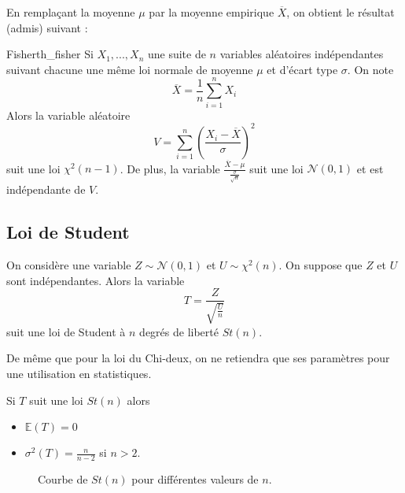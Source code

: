 En remplaçant la moyenne $\mu$ par la moyenne empirique $\overline{X}$, on obtient le résultat (admis) suivant :

\begin{theoreme}{Fisher}{th_fisher}
	Si $X_1,...,X_n$ une suite de $n$ variables aléatoires indépendantes suivant chacune une même loi normale de moyenne $\mu$ et d'écart type $\sigma$. On note $$\overline{X}=\frac{1}{n}\sum_{i=1}^n X_i$$
	Alors la variable aléatoire 
	$$V =  \sum_{i=1}^{n} \left(\frac{X_i-\overline{X}}{\sigma} \right)^2$$
	suit une loi $\chi^2(n-1)$.
	De plus, la variable $\frac{\overline{X}-\mu}{\frac{\sigma}{\sqrt{n}}}$ suit une loi $\mathcal{N}(0,1)$ et est indépendante de $V$. 
\end{theoreme}

\subsection{Loi de Student}
\begin{definition}{}{}
	On considère une variable $Z \sim \mathcal{N}(0,1)$ et $U \sim \chi^2(n)$. On suppose que $Z$ et $U$ sont indépendantes. Alors la variable $$T=\frac{Z}{\sqrt{\frac{U}{n}}}$$ suit une loi de Student à $n$ degrés de liberté $St(n)$.
\end{definition}

De même que pour la loi du Chi-deux, on ne retiendra que ses paramètres pour une utilisation en statistiques.

\begin{proposition}{}{}
	Si $T$ suit une loi $St(n)$ alors 
	\begin{itemize}
		\item $\mathbb{E}(T) = 0$
		\item $\sigma^2(T)=\frac{n}{n-2}$ si $n>2$.
	\end{itemize}
\end{proposition}

\begin{figure}[h!]
	\centering
	\caption{Courbe de $St(n)$ pour différentes valeurs de $n$.  }
\end{figure}

